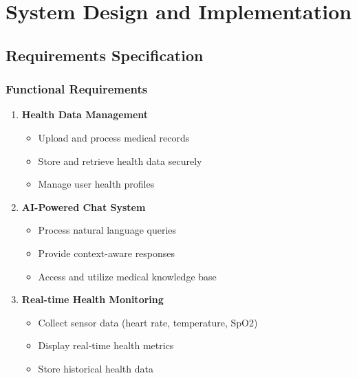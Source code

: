 \section{System Design and Implementation}

\subsection{Requirements Specification}

\subsubsection{Functional Requirements}
\begin{enumerate}
    \item \textbf{Health Data Management}
    \begin{itemize}
        \item Upload and process medical records
        \item Store and retrieve health data securely
        \item Manage user health profiles
    \end{itemize}

    \item \textbf{AI-Powered Chat System}
    \begin{itemize}
        \item Process natural language queries
        \item Provide context-aware responses
        \item Access and utilize medical knowledge base
    \end{itemize}

    \item \textbf{Real-time Health Monitoring}
    \begin{itemize}
        \item Collect sensor data (heart rate, temperature, SpO2)
        \item Display real-time health metrics
        \item Store historical health data
    \end{itemize}
\end{enumerate}

